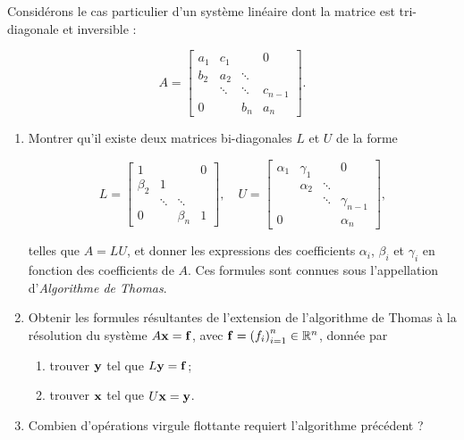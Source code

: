 Considérons le cas particulier d'un système linéaire dont la matrice est tri-diagonale et inversible :

\begin{equation*}
  A = 
  \begin{bmatrix}
      a_1   & c_1     &             &   0        \\
      b_2   & a_2     & \ddots      &           \\
            & \ddots  & \ddots      & c_{n-1}        \\
        0   &         &    b_{n}    &     a_{n}
    \end{bmatrix}
    .
\end{equation*}

\begin{enumerate}[label=\alph*)]
  \item Montrer qu'il existe deux matrices bi-diagonales $L$ et $U$ de la forme
  
  \begin{equation*}
    L = 
    \begin{bmatrix}
          1       &         &             &   0        \\
        \beta_2   & 1       &             &           \\
                  & \ddots  &   \ddots    &          \\
          0       &         &  \beta_{n}  &     1
      \end{bmatrix}
      , 
      \quad
      U = 
      \begin{bmatrix}
            \alpha_{1}  &    \gamma_{1}     &             &   0        \\
                        &    \alpha_{2}     &    \ddots   &           \\
                        &                   &   \ddots    & \gamma_{n-1}     \\
            0           &                   &             & \alpha_{n}
        \end{bmatrix}
        ,
  \end{equation*}
  
  telles que $A = LU$, et donner les expressions des coefficients $\alpha_{i}$, $\beta_{i}$ et $\gamma_{i}$ en fonction des coefficients de $A$.
  Ces formules sont connues sous l'appellation d'\textit{Algorithme de Thomas}.
  
  \item Obtenir les formules résultantes de l'extension de l'algorithme de Thomas à la résolution du système $A \mathbf{x} = \mathbf{f}$, avec $\mathbf{f} = \left(f_{i}\right)^{n}_{i=1} \in \mathbb{R}^{n}$, donnée par
    \begin{enumerate}[label=(\alph*)]
      \item trouver $\mathbf{y}$ tel que $L \mathbf{y} = \mathbf{f}$;
      \item trouver $\mathbf{x}$ tel que $U \mathbf{x} = \mathbf{y}$.
    \end{enumerate}
    
  \item Combien d'opérations virgule flottante requiert l'algorithme précédent ?

\end{enumerate}








